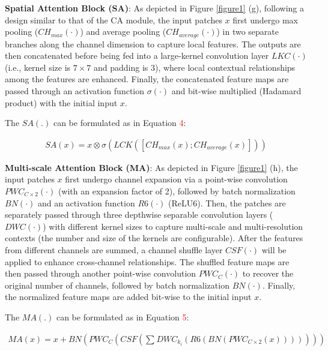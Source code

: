 \documentclass[runningheads]{llncs}
\begin{document}
\textbf{Spatial Attention Block (SA)}\cite{woo2018cbam}: As depicted in Figure \textcolor{red}{\ref{figure1}} (g), following a design similar to that of the CA module, the input patches $x$ first undergo max pooling ($CH_{max}(\cdot)$) and average pooling ($CH_{average}(\cdot)$) in two separate branches along the channel dimension to capture local features. The outputs are then concatenated before being fed into a large-kernel convolution layer $LKC(\cdot)$ (i.e., kernel size is $7\times7$ and padding is 3), where local contextual relationships among the features are enhanced. Finally, the concatenated feature maps are passed through an activation function $\sigma(\cdot)$ and bit-wise multiplied (Hadamard product) with the initial input $x$.

The $SA(.)$ can be formulated as in Equation \textcolor{red}{4}:
\begin{scriptsize}   
\begin{align}
  SA(x) = x \otimes \sigma(LCK([CH_{max}(x); CH_{average}(x)]))
\end{align}
\end{scriptsize}

\textbf{Multi-scale Attention Block (MA)}: As depicted in Figure \textcolor{red}{\ref{figure1}} (h), the input patches $x$ first undergo channel expansion via a point-wise convolution $PWC_{C\times 2}(\cdot)$ (with an expansion factor of 2), followed by batch normalization $BN(\cdot)$ and an activation function $R6(\cdot)$ (ReLU6\cite{howard2017mobilenets}). Then, the patches are separately passed through three depthwise separable convolution layers ($DWC(\cdot)$) with different kernel sizes to capture multi-scale and multi-resolution contexts (the number and size of the kernels are configurable). After the features from different channels are summed, a channel shuffle layer\cite{zhang2018shufflenet} $CSF(\cdot)$ will be applied to enhance cross-channel relationships. The shuffled feature maps are then passed through another point-wise convolution $PWC_C(\cdot)$ to recover the original number of channels, followed by batch normalization $BN(\cdot)$. Finally, the normalized feature maps are added bit-wise to the initial input $x$.

The $MA(.)$ can be formulated as in Equation \textcolor{red}{5}:
\begin{scriptsize}   
\begin{align}
  MA(x)=x+BN(PWC_{C}(CSF(\sum_{}^{}DWC_{k_i}(R6(BN(PWC_{C\times2}(x)))))))
\end{align}
\end{scriptsize}
\end{document}
